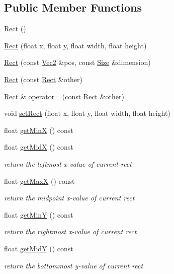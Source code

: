 \subsection*{Public Member Functions}
\begin{DoxyCompactItemize}
\item 
\hyperlink{classRect_a911e531b86de33734dd7de3456722115}{Rect} ()
\item 
\hyperlink{classRect_a2ccad9ce15ee46a8957448a0bafbb8e9}{Rect} (float x, float y, float width, float height)
\item 
\hyperlink{classRect_a83b42c791d8ce7b8c08356755abe295c}{Rect} (const \hyperlink{classVec2}{Vec2} \&pos, const \hyperlink{classSize}{Size} \&dimension)
\item 
\hyperlink{classRect_a82f6b6e265c6c9ef8c644e2d0660a2bb}{Rect} (const \hyperlink{classRect}{Rect} \&other)
\item 
\hyperlink{classRect}{Rect} \& \hyperlink{classRect_addbc75d3b9aefa1cc63a6d81009a3c38}{operator=} (const \hyperlink{classRect}{Rect} \&other)
\item 
void \hyperlink{classRect_ab9d3a5d029bc97ff8763c9e2ec7ed2f7}{set\+Rect} (float x, float y, float width, float height)
\item 
float \hyperlink{classRect_aeb245e3c08e311b8d6cf7ca0ab5b71e5}{get\+MinX} () const
\item 
float \hyperlink{classRect_a0d644f512a90863b28d73c445113702b}{get\+MidX} () const
\begin{DoxyCompactList}\small\item\em return the leftmost x-\/value of current rect \end{DoxyCompactList}\item 
float \hyperlink{classRect_a12e69431d11ad75d3cee64e6809325c8}{get\+MaxX} () const
\begin{DoxyCompactList}\small\item\em return the midpoint x-\/value of current rect \end{DoxyCompactList}\item 
float \hyperlink{classRect_abe95583121eb9041bd9dcedbebbdb704}{get\+MinY} () const
\begin{DoxyCompactList}\small\item\em return the rightmost x-\/value of current rect \end{DoxyCompactList}\item 
float \hyperlink{classRect_a7454d7f94e0903740ed119f1cb780733}{get\+MidY} () const
\begin{DoxyCompactList}\small\item\em return the bottommost y-\/value of current rect \end{DoxyCompactList}\item 

\end{DoxyCompactItemize}
